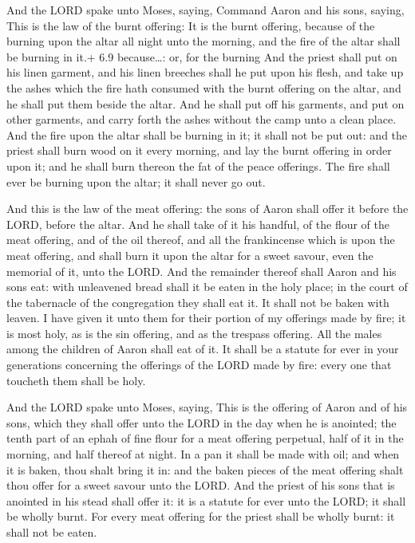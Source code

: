  And the LORD spake unto Moses, saying, 
Command Aaron and his sons, saying, This is the law of the burnt
offering: It is the burnt offering, because of the burning upon the
altar all night unto the morning, and the fire of the altar shall be
burning in it.+ 6.9 because\ldots: or, for the burning  And
the priest shall put on his linen garment, and his linen breeches shall
he put upon his flesh, and take up the ashes which the fire hath
consumed with the burnt offering on the altar, and he shall put them
beside the altar.  And he shall put off his garments, and
put on other garments, and carry forth the ashes without the camp unto a
clean place.  And the fire upon the altar shall be burning
in it; it shall not be put out: and the priest shall burn wood on it
every morning, and lay the burnt offering in order upon it; and he shall
burn thereon the fat of the peace offerings.  The fire
shall ever be burning upon the altar; it shall never go out.

 And this is the law of the meat offering: the sons of
Aaron shall offer it before the LORD, before the altar. 
And he shall take of it his handful, of the flour of the meat offering,
and of the oil thereof, and all the frankincense which is upon the meat
offering, and shall burn it upon the altar for a sweet savour, even the
memorial of it, unto the LORD.  And the remainder thereof
shall Aaron and his sons eat: with unleavened bread shall it be eaten in
the holy place; in the court of the tabernacle of the congregation they
shall eat it.  It shall not be baken with leaven. I have
given it unto them for their portion of my offerings made by fire; it is
most holy, as is the sin offering, and as the trespass offering.
 All the males among the children of Aaron shall eat of it.
It shall be a statute for ever in your generations concerning the
offerings of the LORD made by fire: every one that toucheth them shall
be holy.

 And the LORD spake unto Moses, saying, 
This is the offering of Aaron and of his sons, which they shall offer
unto the LORD in the day when he is anointed; the tenth part of an ephah
of fine flour for a meat offering perpetual, half of it in the morning,
and half thereof at night.  In a pan it shall be made with
oil; and when it is baken, thou shalt bring it in: and the baken pieces
of the meat offering shalt thou offer for a sweet savour unto the LORD.
 And the priest of his sons that is anointed in his stead
shall offer it: it is a statute for ever unto the LORD; it shall be
wholly burnt.  For every meat offering for the priest shall
be wholly burnt: it shall not be eaten.

